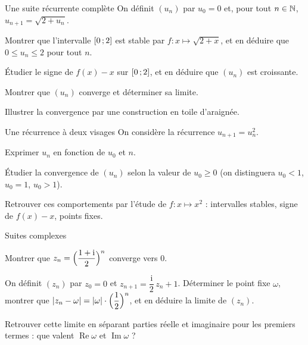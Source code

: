 \begin{exercice}[2]{Une suite récurrente complète}
On définit $(u_n)$ par $u_0=0$ et, pour tout $n\in\mathbb{N}$,
$u_{n+1}=\sqrt{2+u_n}$.
\begin{questions}
  \item Montrer que l'intervalle $\mathopen{[}0\,{;}\,2\mathclose{]}$ est stable par
    $f:x\mapsto\sqrt{2+x}$, et en déduire que $0\leq u_n\leq2$ pour tout $n$.
  \item Étudier le signe de $f(x)-x$ sur $\mathopen{[}0\,{;}\,2\mathclose{]}$, et en déduire que
    $(u_n)$ est croissante.
  \item Montrer que $(u_n)$ converge et déterminer sa limite.
  \item Illustrer la convergence par une construction en toile d'araignée.
\end{questions}
\end{exercice}

\begin{exercice}[2]{Une récurrence à deux visages}
On considère la récurrence $u_{n+1}=u_n^{2}$.
\begin{questions}
  \item Exprimer $u_n$ en fonction de $u_0$ et $n$.
  \item Étudier la convergence de $(u_n)$ selon la valeur de $u_0\geq0$
    (on distinguera $u_0<1$, $u_0=1$, $u_0>1$).
  \item Retrouver ces comportements par l'étude de $f:x\mapsto x^{2}$ :
    intervalles stables, signe de $f(x)-x$, points fixes.
\end{questions}
\end{exercice}

\begin{exercice}[2]{Suites complexes}
\begin{questions}
  \item Montrer que $z_n=\Bigl(\dfrac{1+\mathrm{i}}{2}\Bigr)^{n}$ converge
    vers $0$.
  \item On définit $(z_n)$ par $z_0=0$ et
    $z_{n+1}=\dfrac{\mathrm{i}}{2}\,z_n+1$. Déterminer le point fixe
    $\omega$, montrer que $|z_n-\omega|=|\omega|\cdot\Bigl(\dfrac12\Bigr)^{n}$,
    et en déduire la limite de $(z_n)$.
  \item Retrouver cette limite en séparant parties réelle et imaginaire pour
    les premiers termes : que valent $\operatorname{Re}\omega$ et
    $\operatorname{Im}\omega$ ?
\end{questions}
\end{exercice}



